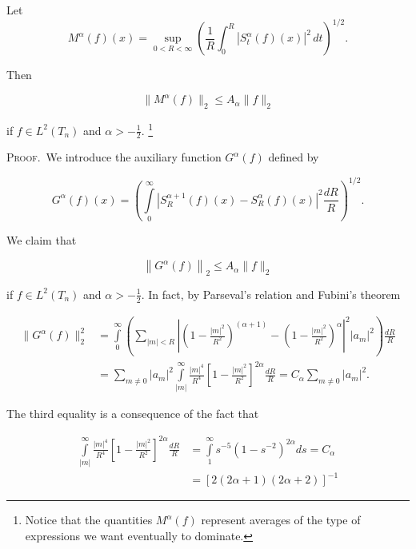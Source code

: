 \begin{lemma}
\label{lem:c7-5-3}
Let
\[
M^{\alpha}(f)(x)=\sup_{0<R<\infty}\left(\frac{1}{R}\int_{0}^{R}|S_{t}^{\alpha}(f)(x)|^{2}\,d t\right)^{1/2}.
\]

\end{lemma}

Then

\begin{equation}\label{eq:c7-5-4}
\|M^{\alpha}(f)\|_{2}\leq A_{\alpha}\|f\|_{2}
\end{equation}

if $f \in L^2(T_n)$ and $\alpha > -\tfrac{1}{2}$. \footnote{Notice that the quantities $M^{\alpha}(f)$ represent averages of the type of expressions we want eventually to dominate.}

\textsc{Proof.}\ We introduce the auxiliary function $G^{\alpha}(f)$ defined by

\[
G^{\alpha}(f)(x)=\left(\int\limits_{0}^{\infty}\left|S_{R}^{\alpha+1}(f)(x)-S_{R}^{\alpha}(f)(x)\right|^{2}\frac{d R}{R}\right)^{1/2}.
\]

We claim that

\begin{equation}\label{eq:c7-5-5}
\left\|{G}^{\alpha}(f)\right\|_{2}\leq A_{\alpha}\|f\|_{2}
\end{equation}

if $f \in L^2(T_n)$ and $\alpha > -\frac{1}{2}$. In fact, by Parseval's relation and Fubini's theorem

\[
\begin{aligned}\|G^{\alpha}(f)\|_{2}^{2}&=\int\limits_{0}^{\infty}\left(\sum_{|m|<R}\left|\left(1-\frac{|m|^{2}}{R^{2}}\right)^{(\alpha+1)}-\left(1-\frac{|m|^{2}}{R^{2}}\right)^{\alpha}\right|^{2}|a_{m}|^{2}\right)\frac{dR}{R}\\&=\sum_{m\neq0}|a_{m}|^{2}\int\limits_{|m|}^{\infty}\frac{|m|^{4}}{R^{4}}\left[1-\frac{|m|^{2}}{R^{2}}\right]^{2\alpha}\frac{dR}{R}=C_{\alpha}\sum_{m\neq0}|a_{m}|^{2}.\end{aligned}
\]

The third equality is a consequence of the fact that

\[
\begin{aligned}\int\limits_{|m|}^{\infty}\frac{|m|^{4}}{R^{4}}\left[1-\frac{|m|^{2}}{R^{2}}\right]^{2\alpha}\frac{dR}{R}&=\int\limits_{1}^{\infty}s^{-5}(1-s^{-2})^{2\alpha}ds=C_{\alpha}\\&=[2(2\alpha+1)(2\alpha+2)]^{-1}\end{aligned}
\]


